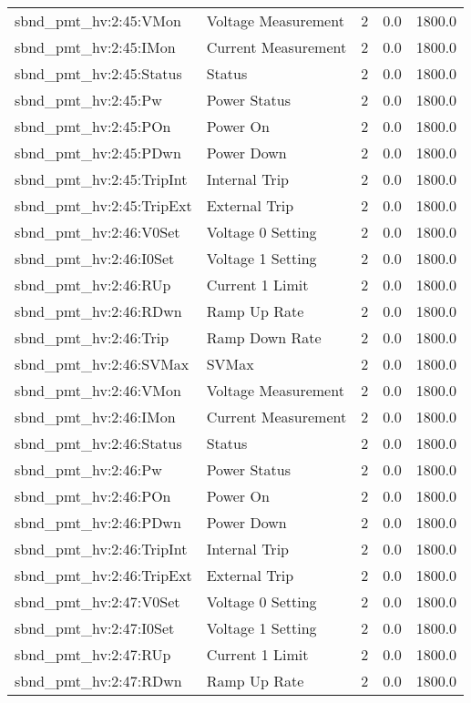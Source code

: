 \begin{center}
\begin{longtable}{l | l l l l }
sbnd\_pmt\_hv:2:45:VMon & Voltage Measurement & 2 & 0.0 & 1800.0\\ 
sbnd\_pmt\_hv:2:45:IMon & Current Measurement & 2 & 0.0 & 1800.0\\ 
sbnd\_pmt\_hv:2:45:Status & Status & 2 & 0.0 & 1800.0\\ 
sbnd\_pmt\_hv:2:45:Pw & Power Status & 2 & 0.0 & 1800.0\\ 
sbnd\_pmt\_hv:2:45:POn & Power On & 2 & 0.0 & 1800.0\\ 
sbnd\_pmt\_hv:2:45:PDwn & Power Down & 2 & 0.0 & 1800.0\\ 
sbnd\_pmt\_hv:2:45:TripInt & Internal Trip & 2 & 0.0 & 1800.0\\ 
sbnd\_pmt\_hv:2:45:TripExt & External Trip & 2 & 0.0 & 1800.0\\ 
sbnd\_pmt\_hv:2:46:V0Set & Voltage 0 Setting & 2 & 0.0 & 1800.0\\ 
sbnd\_pmt\_hv:2:46:I0Set & Voltage 1 Setting & 2 & 0.0 & 1800.0\\ 
sbnd\_pmt\_hv:2:46:RUp & Current 1 Limit & 2 & 0.0 & 1800.0\\ 
sbnd\_pmt\_hv:2:46:RDwn & Ramp Up Rate & 2 & 0.0 & 1800.0\\ 
sbnd\_pmt\_hv:2:46:Trip & Ramp Down Rate & 2 & 0.0 & 1800.0\\ 
sbnd\_pmt\_hv:2:46:SVMax & SVMax & 2 & 0.0 & 1800.0\\ 
sbnd\_pmt\_hv:2:46:VMon & Voltage Measurement & 2 & 0.0 & 1800.0\\ 
sbnd\_pmt\_hv:2:46:IMon & Current Measurement & 2 & 0.0 & 1800.0\\ 
sbnd\_pmt\_hv:2:46:Status & Status & 2 & 0.0 & 1800.0\\ 
sbnd\_pmt\_hv:2:46:Pw & Power Status & 2 & 0.0 & 1800.0\\ 
sbnd\_pmt\_hv:2:46:POn & Power On & 2 & 0.0 & 1800.0\\ 
sbnd\_pmt\_hv:2:46:PDwn & Power Down & 2 & 0.0 & 1800.0\\ 
sbnd\_pmt\_hv:2:46:TripInt & Internal Trip & 2 & 0.0 & 1800.0\\ 
sbnd\_pmt\_hv:2:46:TripExt & External Trip & 2 & 0.0 & 1800.0\\ 
sbnd\_pmt\_hv:2:47:V0Set & Voltage 0 Setting & 2 & 0.0 & 1800.0\\ 
sbnd\_pmt\_hv:2:47:I0Set & Voltage 1 Setting & 2 & 0.0 & 1800.0\\ 
sbnd\_pmt\_hv:2:47:RUp & Current 1 Limit & 2 & 0.0 & 1800.0\\ 
sbnd\_pmt\_hv:2:47:RDwn & Ramp Up Rate & 2 & 0.0 & 1800.0\\ 

\end{longtable}
\end{center}
